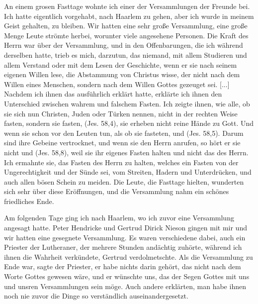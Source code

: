 An einem grosen Fasttage wohnte ich einer der Versammlungen 
der Freunde bei. Ich hatte eigentlich vorgehabt, nach
Haarlem zu gehen, aber ich wurde in meinem Geist gehalten, zu
bleiben. Wir hatten eine sehr große Versammlung, eine große
Menge Leute strömte herbei, worunter viele angesehene Personen.
Die Kraft des Herrn war über der Versammlung, und in den
Offenbarungen, die ich während derselben 
hatte, trieb es mich,
darzutun, das niemand, mit allem Studieren und allem Verstand
oder mit dem Lesen der Geschichte, wenn er sie nach seinem eigenen
Willen lese, die Abstammung von Christus wisse, der nicht nach
dem Willen eines Menschen, sondern nach dem Willen Gottes
gezeuget sei. [...] Nachdem ich ihnen das ausführlich erklärt hatte,
erklärte ich ihnen den Unterschied zwischen wahrem und falschem
Fasten. Ich zeigte ihnen, wie alle, ob sie sich 
nun Christen, Juden oder Türken nennen, 
nicht in der rechten Weise fasten, sondern sie
fasten, 
(Jes. 58,4), sie erheben nicht 
reine Hände zu Gott. Und wenn sie
schon vor den Leuten tun, als ob sie fasteten, und (Jes. 58,5). Darum sind 
ihre Gebeine vertrocknet,
und wenn sie den Herrn anrufen, so hört er sie nicht und (Jes. 58,8), 
weil sie ihr eigenes Fasten
halten und nicht das des Herrn. Ich ermahnte sie, das Fasten
des Herrn zu halten, welches ein Fasten von der Ungerechtigkeit
und der Sünde sei, vom Streiten, Hadern und Unterdrücken, und
auch allen bösen Schein zu meiden. Die Leute, die Fasttage
hielten, wunderten sich sehr über diese Eröffnungen, und die 
Versammlung nahm ein schönes friedliches Ende.

Am folgenden Tage ging ich nach Haarlem, wo ich zuvor eine
Versammlung angesagt hatte. Peter Hendricke 
und Gertrud Dirick Nieson 
gingen mit mir und wir hatten eine gesegnete Versammlung. 
Es waren verschiedene  dabei, auch ein
Priester der Lutheraner, der mehrere 
Stunden andächtig zuhörte, 
während ich ihnen die Wahrheit verkündete, Gertrud verdolmetschte. 
Als die Versammlung zu Ende war, sagte der Priester,
er habe nichts darin gehört, das nicht nach dem Worte Gottes
gewesen wäre, und er wünschte uns, das der Segen Gottes mit
uns und unsren Versammlungen sein möge. Auch andere erklärten,
man habe ihnen noch nie zuvor die Dinge so verständlich 
auseinandergesetzt.

